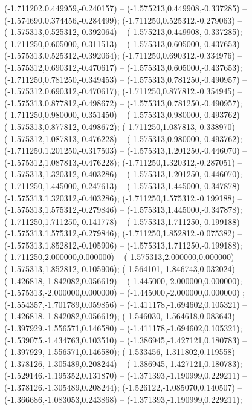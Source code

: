  (-1.711202,0.449959,-0.240157) -- (-1.575213,0.449908,-0.337285) -- (-1.574690,0.374456,-0.284499);
 (-1.711250,0.525312,-0.279063) -- (-1.575313,0.525312,-0.392064) -- (-1.575213,0.449908,-0.337285);
 (-1.711250,0.605000,-0.311513) -- (-1.575313,0.605000,-0.437653) -- (-1.575313,0.525312,-0.392064);
 (-1.711250,0.690312,-0.334976) -- (-1.575312,0.690312,-0.470617) -- (-1.575313,0.605000,-0.437653);
 (-1.711250,0.781250,-0.349453) -- (-1.575313,0.781250,-0.490957) -- (-1.575312,0.690312,-0.470617);
 (-1.711250,0.877812,-0.354945) -- (-1.575313,0.877812,-0.498672) -- (-1.575313,0.781250,-0.490957);
 (-1.711250,0.980000,-0.351450) -- (-1.575313,0.980000,-0.493762) -- (-1.575313,0.877812,-0.498672);
 (-1.711250,1.087813,-0.338970) -- (-1.575312,1.087813,-0.476228) -- (-1.575313,0.980000,-0.493762);
 (-1.711250,1.201250,-0.317503) -- (-1.575313,1.201250,-0.446070) -- (-1.575312,1.087813,-0.476228);
 (-1.711250,1.320312,-0.287051) -- (-1.575313,1.320312,-0.403286) -- (-1.575313,1.201250,-0.446070);
 (-1.711250,1.445000,-0.247613) -- (-1.575313,1.445000,-0.347878) -- (-1.575313,1.320312,-0.403286);
 (-1.711250,1.575312,-0.199188) -- (-1.575313,1.575312,-0.279846) -- (-1.575313,1.445000,-0.347878);
 (-1.711250,1.711250,-0.141778) -- (-1.575313,1.711250,-0.199188) -- (-1.575313,1.575312,-0.279846);
 (-1.711250,1.852812,-0.075382) -- (-1.575313,1.852812,-0.105906) -- (-1.575313,1.711250,-0.199188);
 (-1.711250,2.000000,0.000000) -- (-1.575313,2.000000,0.000000) -- (-1.575313,1.852812,-0.105906);
 (-1.564101,-1.846743,0.032024) -- (-1.426818,-1.842082,0.056619) -- (-1.445000,-2.000000,0.000000);
 (-1.575313,-2.000000,0.000000) -- (-1.445000,-2.000000,0.000000) ;
 (-1.554357,-1.701789,0.059856) -- (-1.411178,-1.694602,0.105321) -- (-1.426818,-1.842082,0.056619);
 (-1.546030,-1.564618,0.083643) -- (-1.397929,-1.556571,0.146580) -- (-1.411178,-1.694602,0.105321);
 (-1.539075,-1.434763,0.103510) -- (-1.386945,-1.427121,0.180783) -- (-1.397929,-1.556571,0.146580);
 (-1.533456,-1.311802,0.119558) -- (-1.378126,-1.305489,0.208244) -- (-1.386945,-1.427121,0.180783);
 (-1.529146,-1.195352,0.131870) -- (-1.371393,-1.190999,0.229211) -- (-1.378126,-1.305489,0.208244);
 (-1.526122,-1.085070,0.140507) -- (-1.366686,-1.083053,0.243868) -- (-1.371393,-1.190999,0.229211);
